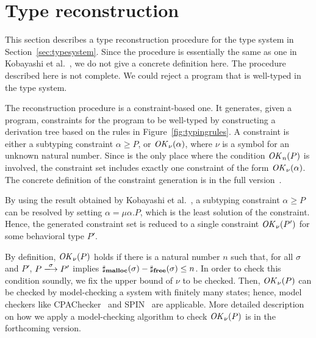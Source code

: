 \section{Type reconstruction}
\label{sec:reconstruction}


This section describes a type reconstruction procedure for the type
system in Section~\ref{sec:typesystem}.  Since the procedure is
essentially the same as one in Kobayashi et
al.~\cite{DBLP:journals/lmcs/KobayashiSW06}, we do not give a concrete
definition here.  The procedure described here is not complete.  We
could reject a program that is well-typed in the type system.

The reconstruction procedure is a constraint-based one.  It generates,
given a program, constraints for the program to be well-typed by
constructing a derivation tree based on the rules in
Figure~\ref{fig:typingrules}.  A constraint is either a subtyping
constraint \(\alpha \ge P\), or \(\mathit{OK}_\nu(\alpha)\), where \(\nu\) is
a symbol for an unknown natural number.  Since  is the only
place where the condition \(\mathit{OK}_n(P)\) is involved, the constraint set
includes exactly one constraint of the form \(\mathit{OK}_\nu(\alpha)\).  The
concrete definition of the constraint generation is in the full
version~\cite{fullversion}.

By using the result obtained by Kobayashi et al.~\cite[Lemma
  3.8]{DBLP:journals/lmcs/KobayashiSW06}, a subtyping constraint
\(\alpha \ge P\) can be resolved by setting \(\alpha = \mu
\alpha. P\), which is the least solution of the constraint.  Hence,
the generated constraint set is reduced to a single constraint
\(\mathit{OK}_{\nu}(P')\) for some behavioral type \(P'\).

By definition, \(\mathit{OK}_{\nu}(P)\) holds if there is a natural number
\(n\) such that, for all \(\sigma\) and \(P'\), \(P
\xlongrightarrow{\sigma} P'\) implies \(\sharp_{\mathbf{malloc}}(\sigma) -
\sharp_{\mathbf{free}}(\sigma) \le n\).  In order to check this condition
soundly, we fix the upper bound of \(\nu\) to be checked.  Then,
\(\mathit{OK}_{\nu}(P)\) can be checked by model-checking a system with
finitely many states; hence, model checkers like CPAChecker~\cite{beyer2011cpachecker}
and SPIN~\cite{holzmann2004spin,Principles of the Spin model checker} are applicable.  More detailed description on how we
apply a model-checking algorithm to check \(\mathit{OK}_\nu(P)\) is in the
forthcoming version.

